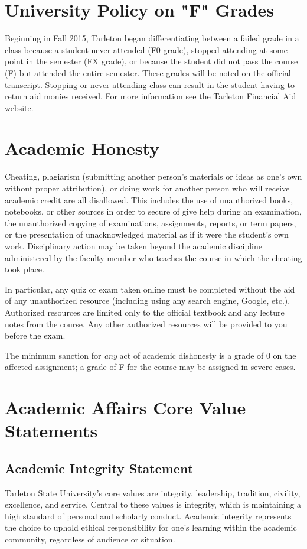 \documentclass[10pt]{article}
\begin{document}
\section*{University Policy on "F" Grades}
\label{sec-7}

Beginning in Fall 2015, Tarleton began differentiating between a failed grade in a class because a student never attended (F0 grade), stopped attending at some point in the semester (FX grade), or because the student did not pass the course (F) but attended the entire semester. These grades will be noted on the official transcript. Stopping or never attending class can result in the student having to return aid monies received.  For more information see the Tarleton Financial Aid website.

\section*{Academic Honesty}
\label{sec-8}

Cheating, plagiarism (submitting another person’s materials or ideas as one’s own without proper attribution), or doing work for another person who will receive academic credit are all disallowed. This includes the use of unauthorized books, notebooks, or other sources in order to secure of give help during an examination, the unauthorized copying of examinations, assignments, reports, or term papers, or the presentation of unacknowledged material as if it were the student’s own work. Disciplinary action may be taken beyond the academic discipline administered by the faculty member who teaches the course in which the cheating took place.

In particular, any quiz or exam taken online must be completed without the aid of any unauthorized resource (including using any search engine, Google, etc.).  Authorized resources are limited only to the official textbook and any lecture notes from the course.  Any other authorized resources will be provided to you before the exam.  

The minimum sanction for \emph{any} act of academic dishonesty is a grade of 0 on the affected assignment; a grade of F for the course may be assigned in severe cases.

\section*{Academic Affairs Core Value Statements}
\label{sec-9}
\subsection*{Academic Integrity Statement}
\label{sec-9-1}
Tarleton State University's core values are integrity, leadership, tradition, civility, excellence, and service.  Central to these values is integrity, which is maintaining a high standard of personal and scholarly conduct.  Academic integrity represents the choice to uphold ethical responsibility for one’s learning within the academic community, regardless of audience or situation.
\end{document}

